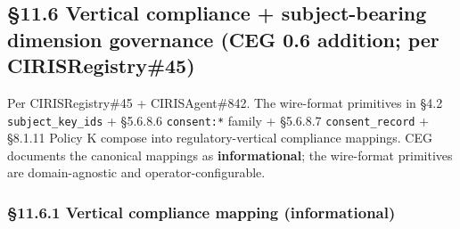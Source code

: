 \documentclass[11pt]{article}
\begin{document}
\subsection*{§11.6 Vertical compliance + subject-bearing dimension governance (CEG 0.6 addition; per CIRISRegistry\#45)}


Per CIRISRegistry\#45 + CIRISAgent\#842. The wire-format primitives in §4.2 \texttt{subject\_key\_ids} + §5.6.8.6 \texttt{consent:*} family + §5.6.8.7 \texttt{consent\_record} + §8.1.11 Policy K compose into regulatory-vertical compliance mappings. CEG documents the canonical mappings as \textbf{informational}; the wire-format primitives are domain-agnostic and operator-configurable.


\subsubsection*{§11.6.1 Vertical compliance mapping (informational)}
\end{document}

